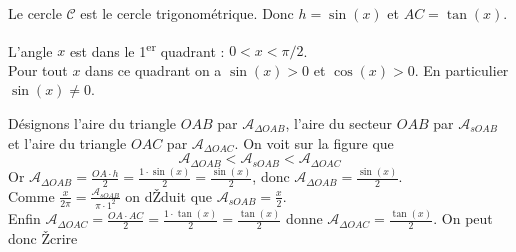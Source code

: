 \documentclass[10pt]{article}
\begin{document}
\begin{multicols}{2}
    \noindent Le cercle $\mathcal{C}$ est le cercle trigonom\'etrique. Donc $h=\sin(x)$ et $AC=\tan(x)$.\\
    \vspace{0.2cm}

    \noindent L'angle $x$ est dans le 1\textsuperscript{er} quadrant : $0<x<\pi/2$.\\
    \noindent Pour tout $x$ dans ce quadrant on a $\sin(x)>0$ et $\cos(x)>0$. En particulier $\sin(x)\not =0$.




\end{multicols}

\noindent D\'esignons l'aire du triangle $OAB$ par $\mathcal{A}_{\Delta OAB}$, l'aire du secteur $OAB$ par $\mathcal{A}_{sOAB}$ et l'aire du triangle $OAC$ par $\mathcal{A}_{\Delta OAC}$. On voit sur la figure que
$$\mathcal{A}_{\Delta OAB} < \mathcal{A}_{sOAB} < \mathcal{A}_{\Delta OAC}$$
\noindent Or $\mathcal{A}_{\Delta OAB}=\frac{OA \cdot h}{2} = \frac{1 \cdot \sin(x)}{2}=\frac{\sin(x)}{2}$, donc $\mathcal{A}_{\Delta OAB}=\frac{\sin(x)}{2}$.\\
Comme $\frac{x}{2\pi}=\frac{\mathcal{A}_{sOAB}}{\pi\cdot 1^2}$ on dŽduit que $\mathcal{A}_{sOAB}=\frac{x}{2}$.\\
Enfin $\mathcal{A}_{\Delta OAC}=\frac{OA \cdot AC}{2}= \frac{1\cdot \tan(x)}{2}=\frac{\tan(x)}{2}$ donne $\mathcal{A}_{\Delta OAC}=\frac{\tan(x)}{2}$.
\newpage
\noindent On peut donc Žcrire\\
\end{document}
